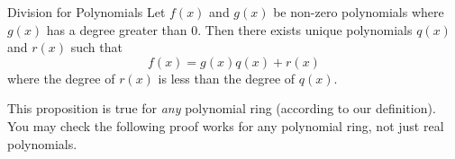 \begin {prop} {Division for Polynomials}
Let $f(x)$ and $g(x)$ be non-zero polynomials where $g(x)$ has a degree greater than 0.  Then there exists unique polynomials $q(x)$ and $r(x)$ such that 
\[
f(x) = g(x)q(x) + r(x)
\]
where the degree of $r(x)$ is less than the degree of $q(x)$.
\end {prop}

\begin {rem}
This proposition is true for \emph{any} polynomial ring (according to our definition). You may check the following proof works for any polynomial ring, not just real polynomials.
\end{rem}



